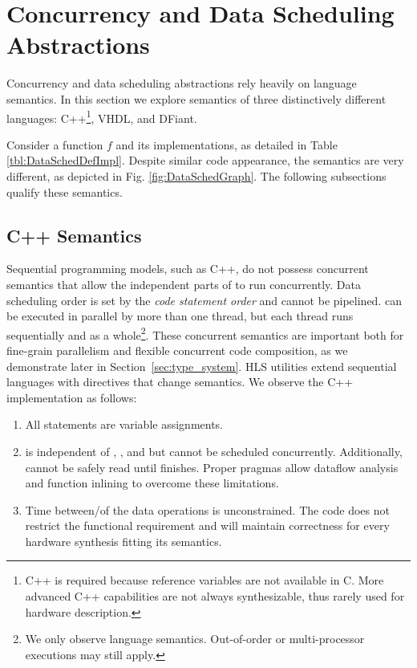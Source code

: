 \section{Concurrency and Data Scheduling Abstractions}
\label{sec:concurrency_abstractions}

Concurrency and data scheduling abstractions rely heavily on language semantics. In this section we explore semantics of three distinctively different languages: C++\footnote{C++ is required because reference \code{\&} variables are not available in C. More advanced C++ capabilities are not always synthesizable, thus rarely used for hardware description.}, VHDL, and DFiant.

Consider a function $f$ and its implementations, as detailed in Table \ref{tbl:DataSchedDefImpl}. Despite similar code appearance, the semantics are very different, as depicted in Fig. \ref{fig:DataSchedGraph}. The following subsections qualify these semantics.




\subsection{C++ Semantics}
Sequential programming models, such as C++, do not possess concurrent semantics that allow the independent parts of  to run concurrently. Data scheduling order is set by the \textit{code statement order} and cannot be pipelined.  can be executed in parallel by more than one thread, but each thread runs  sequentially and as a whole\footnote{We only observe language semantics. Out-of-order or multi-processor executions may still apply.}. These concurrent semantics are important both for fine-grain parallelism and flexible concurrent code composition, as we demonstrate later in Section~\ref{sec:type_system}.  HLS utilities extend sequential languages with  directives that change semantics. We observe the C++  implementation as follows:


\begin{enumerate}[leftmargin=*]
  \item All statements are variable assignments.
  \item {} is independent of , , and  but cannot be scheduled concurrently. Additionally,  cannot be safely read until  finishes. Proper pragmas allow dataflow analysis and function inlining to overcome these limitations.
  \item Time between/of the data operations is unconstrained. The code does not restrict the functional requirement and will maintain correctness for every hardware synthesis fitting its semantics. 
\end{enumerate}  

